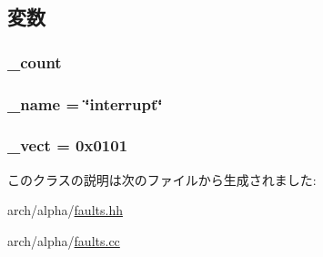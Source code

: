 \subsection{変数}
\hypertarget{classAlphaISA_1_1InterruptFault_a4bff925c412f331c5aaf6a39b79619ff}{
\subsubsection[{\_\-count}]{ {\bf \_\-count}}}
\label{classAlphaISA_1_1InterruptFault_a4bff925c412f331c5aaf6a39b79619ff}
\hypertarget{classAlphaISA_1_1InterruptFault_ac79073ffcd2c66a09bcd3bd3ad206019}{
\subsubsection[{\_\-name}]{ {\bf \_\-name} = \char`\"{}interrupt\char`\"{}}}
\label{classAlphaISA_1_1InterruptFault_ac79073ffcd2c66a09bcd3bd3ad206019}
\hypertarget{classAlphaISA_1_1InterruptFault_ad9e5855b9db0b2824cf6c507be4a872e}{
\subsubsection[{\_\-vect}]{ {\bf \_\-vect} = 0x0101}}
\label{classAlphaISA_1_1InterruptFault_ad9e5855b9db0b2824cf6c507be4a872e}


このクラスの説明は次のファイルから生成されました:\begin{DoxyCompactItemize}
\item 
arch/alpha/\hyperlink{arch_2alpha_2faults_8hh}{faults.hh}\item 
arch/alpha/\hyperlink{arch_2alpha_2faults_8cc}{faults.cc}\end{DoxyCompactItemize}
